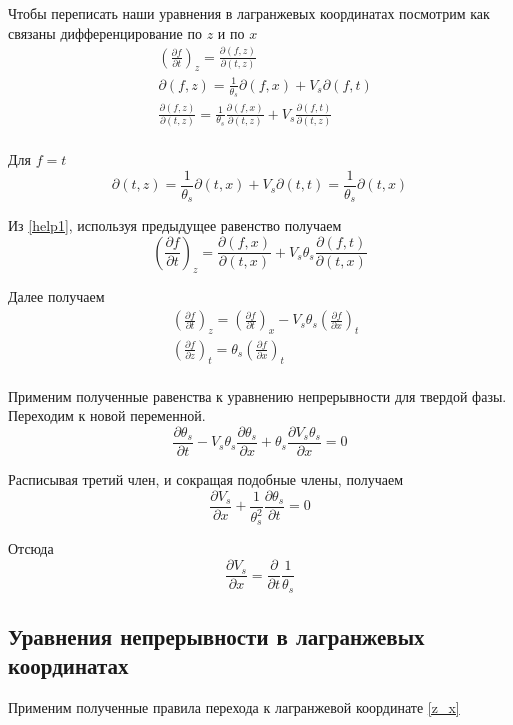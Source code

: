 \documentclass[12pt,a4paper]{article}
\newcommand{\pd}[2]{\frac{\partial #1}{\partial #2}}
\begin{document}
Чтобы переписать наши уравнения в лагранжевых координатах посмотрим как связаны дифференцирование по $ z $ и по $ x $
\begin{equation}
\begin{aligned}
&\left(\pd{f}{t}\right)_z = \pd{(f , z)}{(t , z)}\\
&\partial(f , z) = \frac{1}{\theta_s}\partial(f , x) + V_s \partial(f , t)\\
&\pd{(f , z)}{(t , z)} = \frac{1}{\theta_s}\pd{(f , x)}{(t , z)} + V_s\pd{(f , t)}{(t , z)}\\
\end{aligned}
\label{help1}
\end{equation}

Для $ f = t $ 
$$
\partial(t , z) = \frac{1}{\theta_s} \partial(t , x) + V_s \partial(t , t) = \frac{1}{\theta_s} \partial(t , x)
$$

Из \eqref{help1}, используя предыдущее равенство получаем
$$
\left(\pd{f}{t}\right)_z = \pd{(f , x)}{(t , x)} + V_s \theta_s\pd{(f ,t)}{(t , x)}
$$

Далее получаем
\begin{equation}
\begin{aligned}
&\left(\pd{f}{t}\right)_z = \left(\pd{f}{t}\right)_x - V_s\theta_s\left(\pd{f}{x}\right)_t\\
&\left(\pd{f}{z}\right)_t = \theta_s\left(\pd{f}{x}\right)_t\\
\end{aligned}
\label{z_x}
\end{equation}

Применим полученные равенства к уравнению непрерывности для твердой фазы. Переходим к новой переменной.
$$
\pd{\theta_s}{t} - V_s\theta_s\pd{\theta_s}{x} + \theta_s\pd{V_s\theta_s}{x} =0
$$

Расписывая третий член, и сокращая подобные члены, получаем
$$
\pd{V_s}{x} + \frac{1}{\theta_s^2}\pd{\theta_s}{t} = 0
$$

Отсюда
\begin{equation}
\pd{V_s}{x} = \pd{}{t}\frac{1}{\theta_s}
\label{V_s}
\end{equation}





\subsection{Уравнения непрерывности в лагранжевых координатах}


Применим полученные правила перехода к лагранжевой координате \eqref{z_x}
\end{document}
